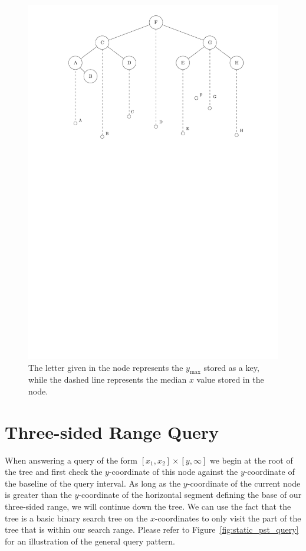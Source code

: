 \documentclass[twoside,11pt,openright]{report}
\begin{document}
\begin{figure}[h]
	\centering
	\includegraphics[scale=0.68]{../figures/internal_pst_static}
	\caption{The letter given in the node represents the $y_{\text{max}}$ stored as a key, while the dashed line represents the median $x$ value stored in the node.}
	\label{fig:static_pst}
\end{figure}

\section{Three-sided Range Query}
When answering a query of the form $[x_1,x_2] \times [y,\infty]$ we begin at the root of the tree and first check the $y$-coordinate of this node against the $y$-coordinate of the baseline of the query interval. As long as the $y$-coordinate of the current node is greater than the $y$-coordinate of the horizontal segment defining the base of our three-sided range, we will continue down the tree. We can use the fact that the tree is a basic binary search tree on the $x$-coordinates to only visit the part of the tree that is within our search range. Please refer to Figure~\ref{fig:static_pst_query} for an illustration of the general query pattern.
\end{document}
